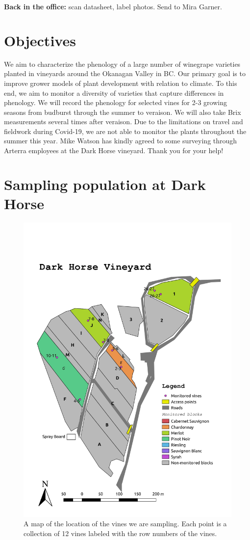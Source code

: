 \documentclass[11pt,letter]{article}
\begin{document}
{\bf Back in the office:} scan datasheet, label photos. Send to Mira Garner.

\newpage

\section{Objectives}
We aim to characterize the phenology of a large number of winegrape varieties planted in vineyards around the Okanagan Valley in BC. Our primary goal is to improve grower models of plant development with relation to climate. To this end, we aim to monitor a diversity of varieties that capture differences in phenology. We will record the phenology for selected vines for 2-3 growing seasons from budburst through the summer to veraison. We will also take Brix measurements several times after veraison. Due to the limitations on travel and fieldwork during Covid-19, we are not able to monitor the plants throughout the summer this year. Mike Watson has kindly agreed to some surveying through Arterra employees at the Dark Horse vineyard. Thank you for your help!

\section{Sampling population at Dark Horse}
\begin{figure}%
  \includegraphics[width=0.9\linewidth]{DH_map.jpg}
  \caption{A map of the location of the vines we are sampling. Each point is a collection of 12 vines labeled with the row numbers of the vines.}
  \label{fig:DH_map}
\end{figure}
\end{document}
